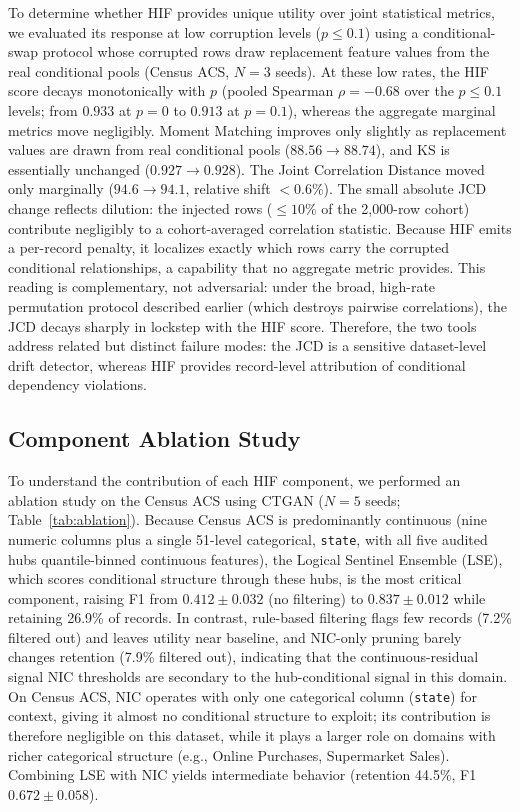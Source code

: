 \documentclass[pdflatex,sn-mathphys-num]{sn-jnl}
\theoremstyle{thmstyleone}%
\theoremstyle{thmstyletwo}%
\theoremstyle{thmstylethree}%
\begin{document}
To determine whether HIF provides unique utility over joint statistical metrics, we evaluated its response at low corruption levels ($p \le 0.1$) using a conditional-swap protocol whose corrupted rows draw replacement feature values from the real conditional pools (Census ACS, $N=3$ seeds). At these low rates, the HIF score decays monotonically with $p$ (pooled Spearman $\rho = -0.68$ over the $p \le 0.1$ levels; from $0.933$ at $p=0$ to $0.913$ at $p=0.1$), whereas the aggregate marginal metrics move negligibly. Moment Matching improves only slightly as replacement values are drawn from real conditional pools ($88.56 \to 88.74$), and KS is essentially unchanged ($0.927 \to 0.928$). The Joint Correlation Distance moved only marginally ($94.6 \to 94.1$, relative shift $<0.6\%$). The small absolute JCD change reflects dilution: the injected rows ($\le 10\%$ of the 2,000-row cohort) contribute negligibly to a cohort-averaged correlation statistic. Because HIF emits a per-record penalty, it localizes exactly which rows carry the corrupted conditional relationships, a capability that no aggregate metric provides. This reading is complementary, not adversarial: under the broad, high-rate permutation protocol described earlier (which destroys pairwise correlations), the JCD decays sharply in lockstep with the HIF score. Therefore, the two tools address related but distinct failure modes: the JCD is a sensitive dataset-level drift detector, whereas HIF provides record-level attribution of conditional dependency violations.

\subsection{Component Ablation Study}\label{sec:ablation}

To understand the contribution of each HIF component, we performed an ablation study on the Census ACS using CTGAN ($N=5$ seeds; Table~\ref{tab:ablation}). Because Census ACS is predominantly continuous (nine numeric columns plus a single 51-level categorical, \texttt{state}, with all five audited hubs quantile-binned continuous features), the Logical Sentinel Ensemble (LSE), which scores conditional structure through these hubs, is the most critical component, raising F1 from $0.412 \pm 0.032$ (no filtering) to $0.837 \pm 0.012$ while retaining 26.9\% of records. In contrast, rule-based filtering flags few records (7.2\% filtered out) and leaves utility near baseline, and NIC-only pruning barely changes retention (7.9\% filtered out), indicating that the continuous-residual signal NIC thresholds are secondary to the hub-conditional signal in this domain. On Census ACS, NIC operates with only one categorical column (\texttt{state}) for context, giving it almost no conditional structure to exploit; its contribution is therefore negligible on this dataset, while it plays a larger role on domains with richer categorical structure (e.g., Online Purchases, Supermarket Sales). Combining LSE with NIC yields intermediate behavior (retention 44.5\%, F1 $0.672 \pm 0.058$).
\end{document}
